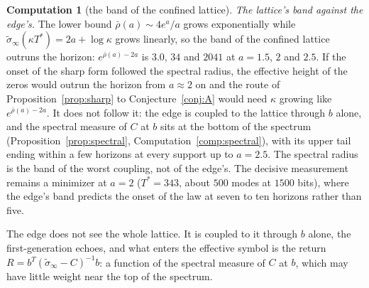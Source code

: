 \documentclass[11pt]{article}
\theoremstyle{definition}
\newtheorem{computation}[theorem]{Computation}
\theoremstyle{remark}
\newcommand{\Tst}{T^{*}}
\begin{document}
\begin{computation}[the band of the confined lattice]
\emph{The lattice's band against the edge's.} The lower bound $\bar\rho(a)\sim4e^a/a$ grows exponentially while $\tilde\sigma_\infty(\kappa\Tst)=2a+\log\kappa$ grows linearly, so the band of the confined lattice outruns the horizon: $e^{\bar\rho(a)-2a}$ is $3.0$, $34$ and $2041$ at $a=1.5$, $2$ and $2.5$. If the onset of the sharp form followed the spectral radius, the effective height of the zeros would outrun the horizon from $a\approx2$ on and the route of Proposition~\ref{prop:sharp} to Conjecture~\ref{conj:A} would need $\kappa$ growing like $e^{\bar\rho(a)-2a}$. It does not follow it: the edge is coupled to the lattice through $b$ alone, and the spectral measure of $C$ at $b$ sits at the bottom of the spectrum (Proposition~\ref{prop:spectral}, Computation~\ref{comp:spectral}), with its upper tail ending within a few horizons at every support up to $a=2.5$. The spectral radius is the band of the worst coupling, not of the edge's. The decisive measurement remains a minimizer at $a=2$ ($\Tst=343$, about $500$ modes at $1500$ bits), where the edge's band predicts the onset of the law at seven to ten horizons rather than five.
\end{computation}


The edge does not see the whole lattice. It is coupled to it through $b$ alone, the first-generation echoes, and what enters the effective symbol is the return $R=b^T(\tilde\sigma_\infty-C)^{-1}b$: a function of the spectral measure of $C$ at $b$, which may have little weight near the top of the spectrum.
\end{document}
